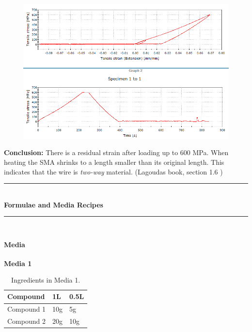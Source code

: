 \documentclass[idxtotoc,hyperref,openany]{labbook} %
\newcommand{\HRule}{\rule{\linewidth}{0.5mm}} %
\begin{document}
\begin{figure}[ht]
\centering
\includegraphics[width=\linewidth]{DYN1_hybrid_SME.png}
\end{figure}

\textbf{Conclusion:} There is a residual strain after loading up to 600 MPa. When heating the SMA shrinks to a length smaller than its original length. This indicates that the wire is \emph{two-way} material. (Lagoudas book, section 1.6 \cite{lagoudas_shape_2008})

\labday{} %

\begin{center}
\HRule \\[0.4cm]
{\huge \textbf{Formulae and Media Recipes}}\\[0.4cm] %
\HRule \\[1.5cm]
\end{center}


\newpage

\huge \textbf{Media} \\ \\

\normalsize \textbf{Media 1}\\
\begin{table}[H]
\begin{tabular}{l l l}
\toprule
\textbf{Compound} & \textbf{1L} & \textbf{0.5L}\\
\toprule
Compound 1 & 10g & 5g\\
Compound 2 & 20g & 10g\\
\bottomrule
\end{tabular}
\caption{Ingredients in Media 1.}
\label{tab:med1}
\end{table}
\end{document}
